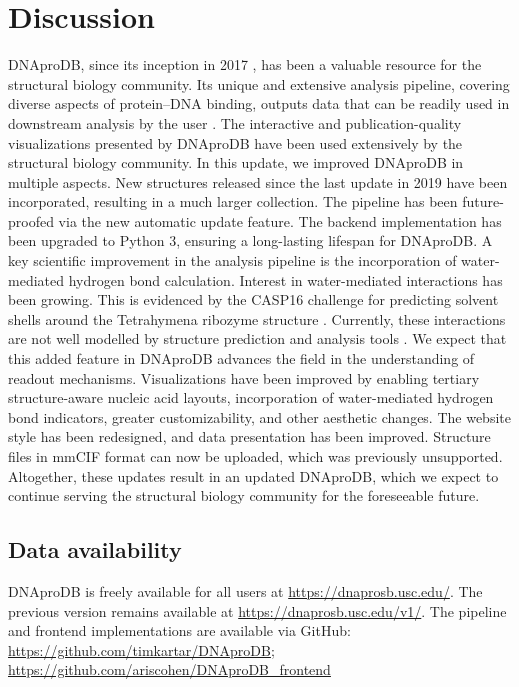 \section{Discussion}
DNAproDB, since its inception in 2017 \citep{Sagendorf2017}, has been a valuable resource for the structural biology community. Its unique and extensive analysis pipeline, covering diverse aspects of protein–DNA binding, outputs data that can be readily used in downstream analysis by the user \citep{Sagendorf2020}. The interactive and publication-quality visualizations presented by DNAproDB have been used extensively by the structural biology community. In this update, we improved DNAproDB in multiple aspects. New structures released since the last update in 2019 \citep{Sagendorf2020} have been incorporated, resulting in a much larger collection. The pipeline has been future-proofed via the new automatic update feature. The backend implementation has been upgraded to Python 3, ensuring a long-lasting lifespan for DNAproDB. 
A key scientific improvement in the analysis pipeline is the incorporation of water-mediated hydrogen bond calculation. Interest in water-mediated interactions has been growing. This is evidenced by the CASP16 challenge for predicting solvent shells around the Tetrahymena ribozyme structure \citep{kryshtafovych2023critical}. Currently, these interactions are not well modelled by structure prediction and analysis tools \citep{Abramson2024, baek2024na, Krishna2024, Mitra2024, Jumper2021, Sagendorf2024}. We expect that this added feature in DNAproDB advances the field in the understanding of readout mechanisms. 
Visualizations have been improved by enabling tertiary structure-aware nucleic acid layouts, incorporation of water-mediated hydrogen bond indicators, greater customizability, and other aesthetic changes. The website style has been redesigned, and data presentation has been improved. Structure files in mmCIF format can now be uploaded, which was previously unsupported. Altogether, these updates result in an updated DNAproDB, which we expect to continue serving the structural biology community for the foreseeable future.

\subsection{Data availability}
DNAproDB is freely available for all users at \url{https://dnaprosb.usc.edu/}. The previous version remains available at \url{https://dnaprosb.usc.edu/v1/}. 
The pipeline and frontend implementations are available via GitHub:
\url{https://github.com/timkartar/DNAproDB}; 
\url{https://github.com/ariscohen/DNAproDB_frontend}

